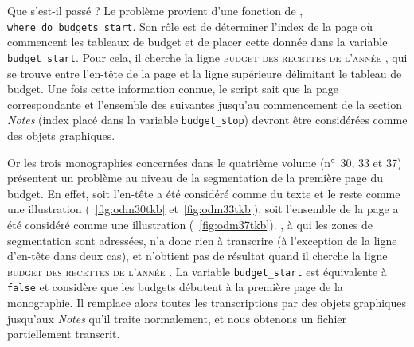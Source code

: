 Que s'est-il passé ? Le problème provient d'une fonction de \lse, \texttt{where\_do\_\-budgets\_start}. Son  rôle est de déterminer l'index de la page où commencent les tableaux de budget et de placer cette donnée dans la variable \texttt{budget\_start}. Pour cela, il cherche la ligne \og \textsc{budget des recettes de l'année} \fg, qui se trouve entre l'en-tête de la page et la ligne supérieure délimitant le tableau de budget. Une fois cette information connue, le script sait que la page correspondante et l'ensemble des suivantes jusqu'au commencement de la section \textit{Notes} (index placé dans la variable \texttt{budget\_stop}) devront être considérées comme des objets graphiques.

Or les trois monographies concernées dans le quatrième volume (n°~30, 33 et 37) présentent un problème au niveau de la segmentation de la première page du budget. En effet, soit l'en-tête a été considéré comme du texte et le reste comme une illustration (\fig{}~\ref{fig:odm30tkb} et~\ref{fig:odm33tkb}), soit l'ensemble de la page a été considéré comme une illustration (\fig{}~\ref{fig:odm37tkb}). \kraken, à qui les zones de segmentation sont adressées, n'a donc rien à transcrire (à l'exception de la ligne d'en-tête dans deux cas), et \lse{} n'obtient pas de résultat quand il cherche la ligne \og \textsc{budget des recettes de l'année} \fg{}. La variable \texttt{budget\_start} est équivalente à \texttt{false} et \lse{} considère que les budgets débutent à la première page de la monographie. Il remplace alors toutes les transcriptions par des objets graphiques jusqu'aux \textit{Notes} qu'il traite normalement, et nous obtenons un fichier partiellement transcrit.

